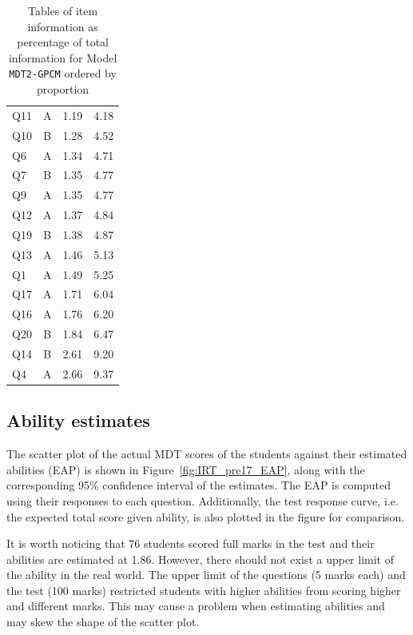 \documentclass[a4paper]{report}
\begin{document}
\begin{table}[H]
\begin{minipage}{0.5\linewidth}
\begin{tabular}{lcrr}
      Q11 & A & 1.19 & 4.18 \\ 
      Q10 & B & 1.28 & 4.52 \\ 
      Q6 & A & 1.34 & 4.71 \\ 
      Q7 & B & 1.35 & 4.77 \\ 
      Q9 & A & 1.35 & 4.77 \\ 
      Q12 & A & 1.37 & 4.84 \\ 
      Q19 & B & 1.38 & 4.87 \\ 
      Q13 & A & 1.46 & 5.13 \\ 
      Q1 & A & 1.49 & 5.25 \\ 
      Q17 & A & 1.71 & 6.04 \\ 
      Q16 & A & 1.76 & 6.20 \\ 
      Q20 & B & 1.84 & 6.47 \\ 
      Q14 & B & 2.61 & 9.20 \\ 
      Q4 & A & 2.66 & 9.37 \\ 
      \hline
    \end{tabular}
  \end{minipage}
  \caption{\label{tab:IRT_pre17_info}Tables of item information as percentage of total information for Model \texttt{MDT2-GPCM} ordered by proportion}
\end{table}

\subsection{\label{sec:IRT_EAP}Ability estimates}

The scatter plot of the actual MDT scores of the students against their estimated abilities (EAP) is shown in Figure~\ref{fig:IRT_pre17_EAP}, along with the corresponding 95\% confidence interval of the estimates. The EAP is computed using their responses to each question. Additionally, the test response curve, i.e. the expected total score given ability, is also plotted in the figure for comparison. 

It is worth noticing that 76 students scored full marks in the test and their abilities are estimated at 1.86. However, there should not exist a upper limit of the ability in the real world. The upper limit of the questions (5 marks each) and the test (100 marks) restricted students with higher abilities from scoring higher and different marks. This may cause a problem when estimating abilities and may skew the shape of the scatter plot. 
\end{document}
